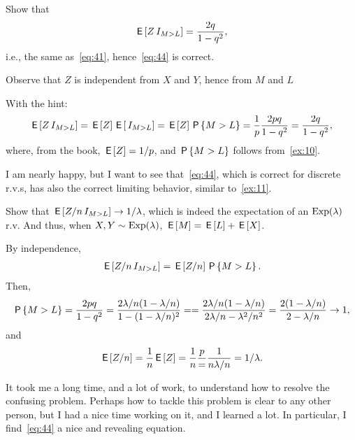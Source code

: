 \documentclass[a4paper,12pt]{article}
\begin{document}
\begin{exercise}
Show that 
\begin{equation}
  \label{eq:45}
\E{Z\1{M>L}} = \frac{2q} {1-q^{2}},
\end{equation}
i.e., the same as~\cref{eq:41}, hence~\cref{eq:44} is correct.
\begin{hint}
Observe that $Z$   is independent from $X$ and $Y$, hence from $M$ and $L$
\end{hint}
\begin{solution} With the hint:
  \begin{align}
    \label{eq:46}
\E{Z\1{M>L}}  = \E Z \E{\1{M>L}} = \E Z \P{M>L} = \frac 1 p \frac{2pq}{1-q^{2}} = \frac{2q}{1-q^{2}},
  \end{align}
where, from the book, $\E Z = 1/p$, and $\P{M>L}$ follows from~\cref{ex:10}. 
\end{solution}
\end{exercise}


I am nearly happy, but I want to see that~\eqref{eq:44}, which is correct for discrete r.v.s, has also the correct limiting behavior, similar to~\cref{ex:11}. 
\begin{exercise}
Show that $\E{Z/n\1{M>L}} \to 1/\lambda$, which is indeed the expectation of an $\Exp{\lambda}$ r.v. And thus, when $X,Y\sim \Exp{\lambda}$, $\E M = \E L + \E X$.
\begin{solution}
By independence,
  \begin{align}
    \label{eq:47}
\E{Z/n\1{M>L}} = \E{Z/n} \P{M>L}. 
  \end{align}
Then,
\begin{align}
  \label{eq:49}
\P{M>L}   = \frac{2pq}{1-q^{2}} 
= \frac{2\lambda/n (1-\lambda/n)}{1-(1-\lambda/n)^{2}} = 
= \frac{2\lambda/n (1-\lambda/n)}{2\lambda/n -\lambda^{2}/n^{2}}  
= \frac{2 (1-\lambda/n)}{2 -\lambda/n}  \to 1,
\end{align}
and
\begin{align}
  \label{eq:50}
\E{Z/n} = \frac 1 n \E Z = \frac 1 n \frac p = \frac 1 {n \lambda/ n} = 1/\lambda.
\end{align}
\end{solution}

\end{exercise}

It took me a long time, and a lot of work, to understand how to resolve the confusing problem.
Perhaps how to tackle this problem is clear to any other person, but I had a nice time working on it, and I learned a lot.
In particular, I find~\cref{eq:44} a nice and revealing equation.




\end{document}
